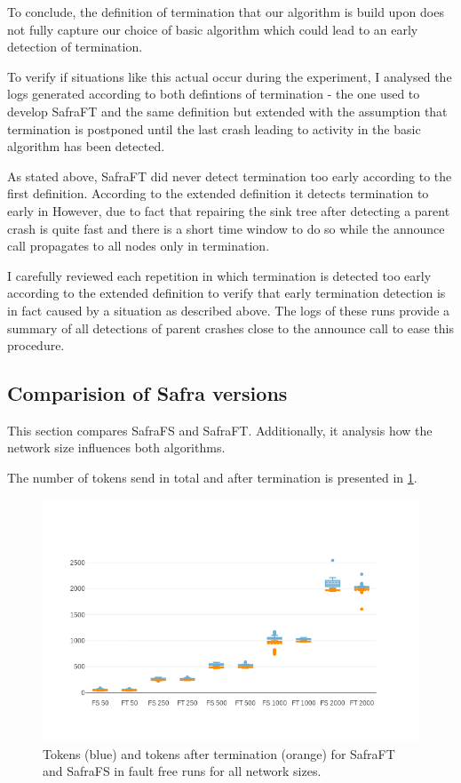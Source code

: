 To conclude, the definition of termination that our algorithm is build upon does not fully capture our choice of basic algorithm which could lead to an early detection of termination.

To verify if situations like this actual occur during the experiment, I analysed the logs generated according to both defintions of termination - the one used to develop SafraFT and the same definition but extended with the assumption that termination is postponed until the last crash leading to activity in the basic algorithm has been detected.

As stated above, SafraFT did never detect termination too early according to the first definition.
According to the extended definition it detects termination to early in %
However, due to fact that repairing the sink tree after detecting a parent crash is quite fast and there is a short time window to do so while the announce call propagates to all nodes only in %
termination.

I carefully reviewed each repetition in which termination is detected too early according to the extended definition to verify that early termination detection is in fact caused by a situation as described above.
The logs of these runs provide a summary of all detections of parent crashes close to the announce call to ease this procedure.

\subsection{Comparision of Safra versions}
This section compares SafraFS and SafraFT. 
Additionally, it analysis how the network size influences both algorithms.

The number of tokens send in total and after termination is presented in \cref{fig:tokens-and-tokens-after}.

\begin{figure}
	\includegraphics{figures/tokens-and-tokens-after.png}
	\caption{Tokens (blue) and tokens after termination (orange) for SafraFT and SafraFS in fault free runs for all network sizes.}
	\label{fig:tokens-and-tokens-after}
\end{figure}

